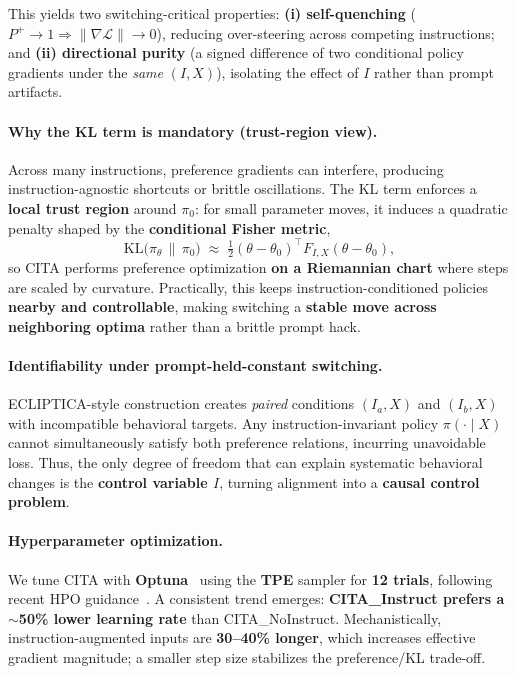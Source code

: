 This yields two switching-critical properties: \textbf{(i) self-quenching} ($P^+\!\to1 \Rightarrow \|\nabla\mathcal{L}\|\to0$), reducing over-steering across competing instructions; and
\textbf{(ii) directional purity} (a signed difference of two conditional policy gradients under the \emph{same} $(I,X)$), isolating the effect of $I$ rather than prompt artifacts.

\vspace{-0.35em}
\paragraph{Why the KL term is mandatory (trust-region view).}
Across many instructions, preference gradients can interfere, producing instruction-agnostic shortcuts or brittle oscillations.
The KL term enforces a \textbf{local trust region} around $\pi_0$:
for small parameter moves, it induces a quadratic penalty shaped by the \textbf{conditional Fisher metric},
\[
\mathrm{KL}\!\big(\pi_{\theta}\,\|\,\pi_{0}\big)
\;\approx\;
\tfrac{1}{2}(\theta-\theta_0)^{\top}F_{I,X}(\theta-\theta_0),
\]
so CITA performs preference optimization \textbf{on a Riemannian chart} where steps are scaled by curvature.
Practically, this keeps instruction-conditioned policies \textbf{nearby and controllable}, making switching a \textbf{stable move across neighboring optima} rather than a brittle prompt hack.

\vspace{-0.35em}
\paragraph{Identifiability under prompt-held-constant switching.}
ECLIPTICA-style construction creates \emph{paired} conditions $(I_a,X)$ and $(I_b,X)$ with incompatible behavioral targets.
Any instruction-invariant policy $\pi(\cdot\mid X)$ cannot simultaneously satisfy both preference relations, incurring unavoidable loss.
Thus, the only degree of freedom that can explain systematic behavioral changes is the \textbf{control variable $I$}, turning alignment into a \textbf{causal control problem}.

\paragraph{Hyperparameter optimization.}
We tune CITA with \textbf{Optuna}~\cite{akiba2019optuna} using the \textbf{TPE} sampler for \textbf{12 trials}, following recent HPO guidance~\cite{liang2023holistic}.
A consistent trend emerges: \textbf{CITA\_Instruct prefers a $\sim$50\% lower learning rate} than CITA\_NoInstruct.
Mechanistically, instruction-augmented inputs are \textbf{30--40\% longer}, which increases effective gradient magnitude; a smaller step size stabilizes the preference/KL trade-off.

